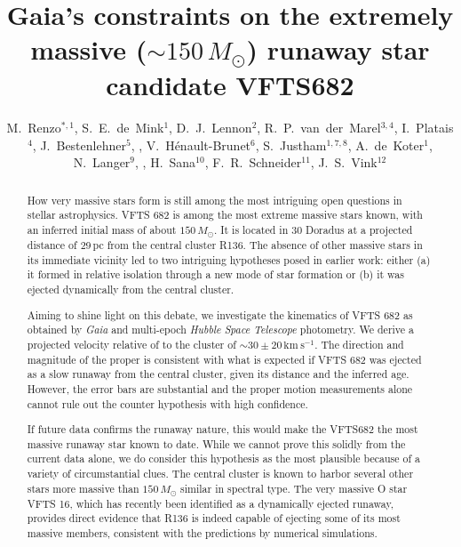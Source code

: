 \documentclass[apjl,twocolumn]{emulateapj}
\newcommand{\SdM}[1]{{{\color{brown}{#1}}}}
\newcommand{\kms}{{\,\mathrm{km\ s^{-1}}}}
\begin{document}
\title{Gaia's constraints on the extremely massive  ($\sim$$150\,M_\odot$) runaway star candidate VFTS682}

\author{M.~Renzo$^{*,1}$, S.~E.~de~Mink$^{1}$, D.~J.~Lennon$^{2}$,
  R.~P.~van~der~Marel$^{3,4}$, I.~Platais$^{4}$, 
  J.~Bestenlehner$^{5}$, \SdM{C.~J.~Evans$^{X}$},
  V.~H\'enault-Brunet$^{6}$,  S.~Justham$^{1,7,8}$,  A.~de~Koter$^{1}$,
  N.~Langer$^{9}$,  \SdM{F. Najarro$^{X}$}, H.~Sana$^{10}$, F.~R.~Schneider$^{11}$, J.~S.~Vink$^{12}$}

\begin{abstract}
 
 How very massive stars form is still among the most intriguing open  questions in stellar astrophysics.  VFTS 682 is among the most  extreme massive stars known, with an inferred initial mass of about  $150\,M_\odot$. It is located in 30 Doradus at a projected distance of 29\,pc from the central cluster R136.  The absence of other massive stars in its immediate vicinity led to two intriguing hypotheses posed in earlier work: either (a) it formed in relative isolation through a new mode of star formation or (b) it was ejected dynamically from the central cluster. 
 
Aiming to shine light on this debate, we investigate the kinematics of  VFTS 682 as obtained by \emph{Gaia} and multi-epoch \emph{Hubble Space Telescope} photometry.    We derive a projected velocity relative of to the cluster of $\sim$$30\pm20\kms$.  The direction and magnitude of the proper is consistent with what is expected if VFTS 682 was ejected as a slow runaway from the central cluster, given its distance and the inferred age.  However, the error bars are substantial and the proper motion measurements alone cannot rule out the counter hypothesis with high confidence.   
 
If future data confirms the runaway nature, this would make the VFTS682 the most massive runaway star known to date.  While we cannot prove this solidly from the current data alone, we do consider this hypothesis as the most plausible because of a variety of circumstantial clues. The central cluster is known to harbor several other stars more massive than $150\,M_\odot$ similar in spectral type.  The very massive O star VFTS 16, which has recently been identified as a dynamically ejected runaway, provides direct evidence that R136 is indeed capable of ejecting some of its most massive members, consistent with the predictions by numerical simulations.
\end{abstract}
\end{document}
